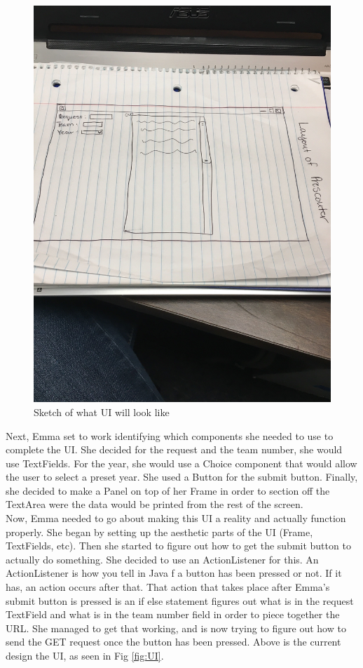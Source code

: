 \documentclass{article}
\begin{document}
\begin{figure}
    \centering
    \includegraphics[width=.6 \textwidth]{24_02-11/images/sketchofUI.JPG}
    \caption{Sketch of what UI will look like}
    \label{fig:sketch}
\end{figure}

Next, Emma set to work identifying which components she needed to use to complete the UI. She decided for the request and the team number, she would use TextFields. For the year, she would use a Choice component that would allow the user to select a preset year. She used a Button for the submit button. Finally, she decided to make a Panel on top of her Frame in order to section off the TextArea were the data would be printed from the rest of the screen. \\

Now, Emma needed to go about making this UI a reality and actually function properly. She began by setting up the aesthetic parts of the UI (Frame, TextFields, etc). Then she started to figure out how to get the submit button to actually do something. She decided to use an ActionListener for this. An ActionListener is how you tell in Java f a button has been pressed or not. If it has, an action occurs after that. That action that takes place after Emma's submit button is pressed is an if else statement figures out what is in the request TextField and what is in the team number field in order to piece together the URL. She managed to get that working, and is now trying to figure out how to send the GET request once the button has been pressed. Above is the current design the UI, as seen in Fig \ref{fig:UI}.
\end{document}
